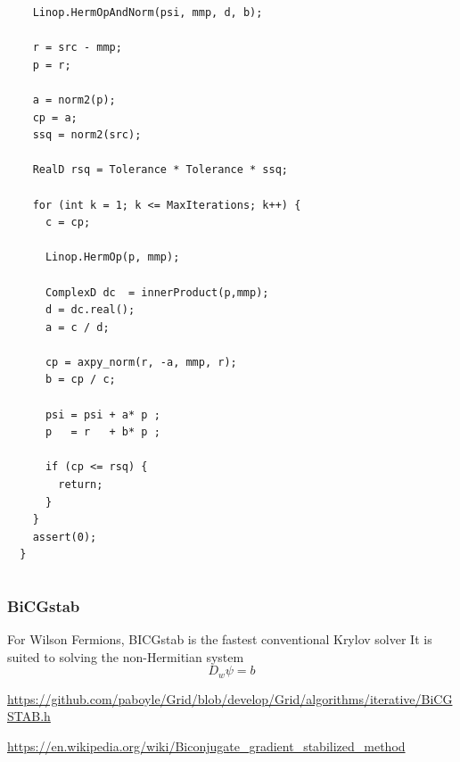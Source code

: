 \documentclass[pdf,ps,8pt]{beamer}
\newcommand{\link}[1]{\href{#1}{ {\color{blue} #1} }}
\begin{document}
\begin{frame}[fragile]
\begin{columns}
\begin{column}{0.5\textwidth}
{\begin{verbatim}
    Linop.HermOpAndNorm(psi, mmp, d, b);
    
    r = src - mmp;
    p = r;

    a = norm2(p);
    cp = a;
    ssq = norm2(src);

    RealD rsq = Tolerance * Tolerance * ssq;

    for (int k = 1; k <= MaxIterations; k++) {
      c = cp;

      Linop.HermOp(p, mmp);

      ComplexD dc  = innerProduct(p,mmp);
      d = dc.real();
      a = c / d;

      cp = axpy_norm(r, -a, mmp, r);
      b = cp / c;

      psi = psi + a* p ;
      p   = r   + b* p ;

      if (cp <= rsq) {
        return;
      }
    }
    assert(0);
  }
  \end{verbatim}
          }
      \end{column}
      \end{columns}

  \end{frame}

  \begin{frame}[fragile]\small\frametitle{ BiCGstab }
    For Wilson Fermions, BICGstab is the fastest conventional Krylov solver
    It is suited to solving the non-Hermitian system $$ D_w \psi = b$$

    \link{https://github.com/paboyle/Grid/blob/develop/Grid/algorithms/iterative/BiCGSTAB.h}

    \href{https://en.wikipedia.org/wiki/Biconjugate_gradient_stabilized_method}
    {{\color{blue} https://en.wikipedia.org/wiki/Biconjugate\_gradient\_stabilized\_method}}
    
  \end{frame}
\end{document}
